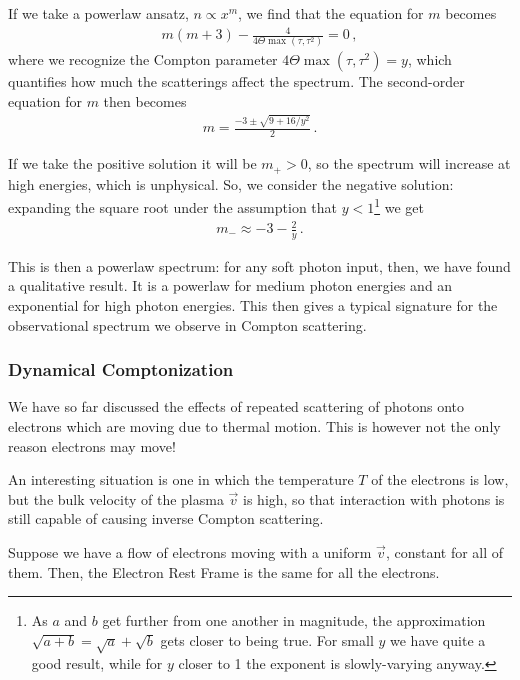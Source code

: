 \documentclass[main.tex]{subfiles}
\begin{document}
If we take a powerlaw ansatz, \(n \propto x^{m}\), we find that the equation for \(m\) becomes 
%
\begin{align}
m(m+3) - \frac{4}{4 \Theta \max (\tau, \tau^2)}= 0 
\,,
\end{align}
%
where we recognize the Compton parameter \(4 \Theta \max (\tau , \tau^2) = y\), which quantifies how much the scatterings affect the spectrum. 
The second-order equation for \(m\) then becomes 
%
\begin{align}
m = \frac{-3 \pm \sqrt{9 + 16 / y^2}}{2}
\,.
\end{align}

If we take the positive solution it will be \(m_+>0\), so the spectrum will increase at high energies, which is unphysical. 
So, we consider the negative solution: expanding the square root under the assumption that \(y < 1\)\footnote{As \(a\) and \(b\) get further from one another in magnitude, the approximation \(\sqrt{a + b} = \sqrt{a} + \sqrt{b}\) gets closer to being true. For small \(y\) we have quite a good result, while for \(y\) closer to 1 the exponent is slowly-varying anyway.} we get 
%
\begin{align}
m_- \approx -3 - \frac{2}{y}
\,.
\end{align}

This is then a powerlaw spectrum: for any soft photon input, then, we have found a qualitative result. It is a powerlaw for medium photon energies and an exponential for high photon energies. 
This then gives a typical signature for the observational spectrum we observe in Compton scattering. 

\subsubsection{Dynamical Comptonization}

We have so far discussed the effects of repeated scattering of photons onto electrons which are moving due to thermal motion. This is however not the only reason electrons may move! 

An interesting situation is one in which the temperature \(T\) of the electrons is low, but the bulk velocity of the plasma \(\vec{v}\) is high, so that interaction with photons is still capable of causing inverse Compton scattering. 

Suppose we have a flow of electrons moving with a uniform \(\vec{v}\), constant for all of them. Then, the Electron Rest Frame is the same for all the electrons. 
\end{document}
